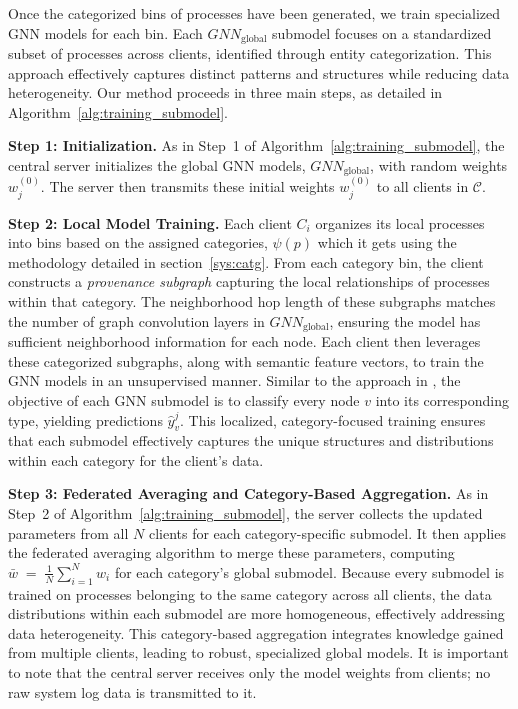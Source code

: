 Once the categorized bins of processes have been generated, we train specialized GNN models for each bin. Each \({GNN}_{\text{global}}\) submodel focuses on a standardized subset of processes across clients, identified through entity categorization. This approach effectively captures distinct patterns and structures while reducing data heterogeneity. Our method proceeds in three main steps, as detailed in Algorithm~\ref{alg:training_submodel}.

\textbf{Step 1: Initialization.} As in Step~1 of Algorithm~\ref{alg:training_submodel}, the central server initializes the global GNN models, \({GNN}_{\text{global}}\), with random weights \( w_j^{(0)} \). The server then transmits these initial weights \( w_j^{(0)} \) to all clients in \(\mathcal{C}\).

\textbf{Step 2: Local Model Training.} Each client \( C_i \) organizes its local processes into bins based on the assigned categories, \(\psi(p)\) which it gets using the methodology detailed in section~\ref{sys:catg}. From each category bin, the client constructs a \emph{provenance subgraph} capturing the local relationships of processes within that category. The neighborhood hop length of these subgraphs matches the number of graph convolution layers in \({GNN}_{\text{global}}\), ensuring the model has sufficient neighborhood information for each node. Each client then leverages these categorized subgraphs, along with semantic feature vectors, to train the GNN models in an unsupervised manner. Similar to the approach in \flash, the objective of each GNN submodel is to classify every node \(v\) into its corresponding type, yielding predictions \(\hat{y}_v^j\). This localized, category-focused training ensures that each submodel effectively captures the unique structures and distributions within each category for the client’s data.

\textbf{Step 3: Federated Averaging and Category-Based Aggregation.} As in Step~2 of Algorithm~\ref{alg:training_submodel}, the server collects the updated parameters from all \( N \) clients for each category-specific submodel. It then applies the federated averaging algorithm to merge these parameters, computing \( \bar{w} \;=\; \frac{1}{N} \sum_{i=1}^{N} w_i \)
for each category’s global submodel. Because every submodel is trained on processes belonging to the same category across all clients, the data distributions within each submodel are more homogeneous, effectively addressing data heterogeneity. This category-based aggregation integrates knowledge gained from multiple clients, leading to robust, specialized global models. It is important to note that the central server receives only the model weights from clients; no raw system log data is transmitted to it.

